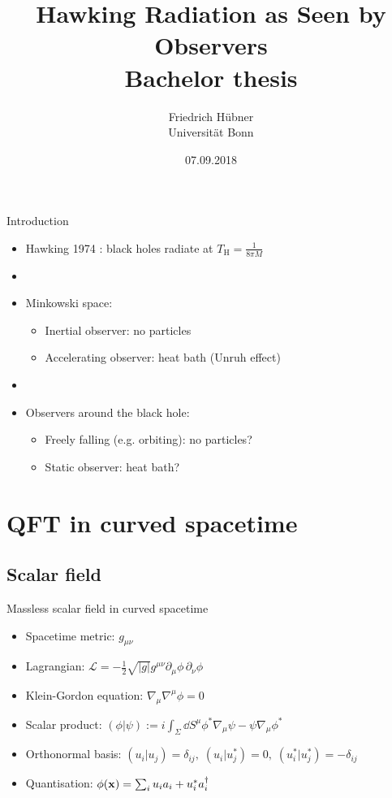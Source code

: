 \documentclass{beamer}
\title[Hawking Radiation for Observers]{\vspace{1cm}Hawking Radiation as Seen by Observers\\\small{Bachelor thesis}}
\author[Friedrich Hübner]{Friedrich Hübner\\Universität Bonn}
\date{07.09.2018}
\newcommand{\ind}[1]{_\mathrm{#1}}
\begin{document}
\beamertemplatenavigationsymbolsempty
\titlepage

\begin{frame}{Introduction}
\begin{itemize}
	\item Hawking 1974 \cite{hawking}: black holes radiate at \(T\ind{H} = \frac{1}{8\pi M}\)
	\item[]
	\item Minkowski space:
		\begin{itemize}
			\item Inertial observer: no particles
			\item Accelerating observer: heat bath (Unruh effect)
		\end{itemize}		 
	\item[]
	\item Observers around the black hole:
		\begin{itemize}
			\item Freely falling (e.g. orbiting): no particles?
			\item Static observer: heat bath?
		\end{itemize}
\end{itemize}
\end{frame}

\frame{\setcounter{tocdepth}{1}\hspace{1cm}\tableofcontents}

\section{QFT in curved spacetime}
\subsection{Scalar field}
\begin{frame}{Massless scalar field in curved spacetime\cite{davies}}
\begin{itemize}
	\item Spacetime metric: \(g_{\mu\nu}\)
	\item Lagrangian: \(\mathcal{L} = -\frac{1}{2}\sqrt{|g|} g^{\mu\nu} \partial_\mu \phi\,\partial_\nu \phi\)
	\item Klein-Gordon equation: \(\nabla_\mu\nabla^\mu \phi = 0\)
	\item Scalar product: \((\phi|\psi) := i \int_{\Sigma}\dd{S^\mu} \phi^*\nabla_\mu \psi - \psi\nabla_\mu \phi^*\)
	\item Orthonormal basis: \((u_i|u_j) = \delta_{ij},\;(u_i|u_j^*) = 0,\;(u_i^*|u_j^*) = -\delta_{ij}\)
	\item Quantisation: \(\phi(\vb{x}) = \sum_i u_i a_i + u_i^*a_i^\dagger\)
\end{itemize}
\end{frame}
\end{document}
